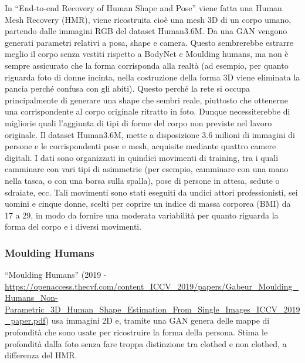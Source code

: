In “End-to-end Recovery of Human Shape and Pose” \cite{kanazawa2018end} viene fatta una Human Mesh Recovery (HMR), viene ricostruita cioè una mesh 3D di un corpo umano, partendo dalle immagini RGB del dataset Human3.6M.
Da una GAN vengono generati parametri relativi a posa, shape e camera.
Questo sembrerebbe estrarre meglio il corpo senza vestiti rispetto a BodyNet e Moulding humans, ma non è sempre assicurato che la forma corrisponda alla realtà (ad esempio, per quanto riguarda foto di donne incinta, nella costruzione della forma 3D viene eliminata la pancia perché confusa con gli abiti). Questo perché la rete si occupa principalmente di generare una shape che sembri reale, piuttosto che ottenerne una corrispondente al corpo originale ritratto in foto.
Dunque necessiterebbe di migliorie quali l’aggiunta di tipi di forme del corpo non previste nel lavoro originale.
Il dataset Human3.6M, mette a disposizione 3.6 milioni di immagini di persone e le corrispondenti pose e mesh, acquisite mediante quattro camere digitali. I dati sono organizzati in quindici movimenti di training, tra i quali camminare con vari tipi di asimmetrie (per esempio, camminare con una mano nella tasca, o con una borsa sulla spalla), pose di persone in attesa, sedute o sdraiate, ecc. Tali movimenti sono stati eseguiti da undici attori professionisti, sei uomini e cinque donne, scelti per coprire un indice di massa corporea (BMI) da 17 a 29, in modo da fornire una moderata variabilità per quanto riguarda la forma del corpo e i diversi movimenti.

\newpage

\subsubsection{Moulding Humans}

“Moulding Humans” (2019 - \url{https://openaccess.thecvf.com/content_ICCV_2019/papers/Gabeur_Moulding_Humans_Non-Parametric_3D_Human_Shape_Estimation_From_Single_Images_ICCV_2019_paper.pdf}) usa immagini 2D e, tramite una GAN genera delle mappe di profondità che sono usate per ricostruire la forma della persona.
Stima le profondità dalla foto senza fare troppa distinzione tra clothed e non clothed, a differenza del HMR.


